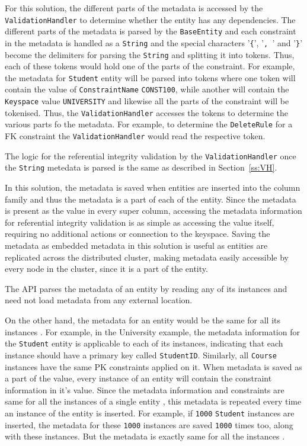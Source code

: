 	For this solution,  the different parts of the metadata is
	accessed by the \texttt{ValidationHandler}  to determine whether the entity has
	any dependencies. The different parts of the metadata is parsed by the
	\texttt{BaseEntity} and each constraint in the metadata is handled as a
	\texttt{String} and the special characters '\texttt{\{}',  '\texttt{, }' and
	'\texttt{\}}' become the delimiters for parsing the \texttt{String} and
	splitting it into tokens. Thus, each of these tokens
	would hold one of the parts of the constraint. For example, the metadata for
	\texttt{Student} entity will be parsed into tokens where one token will
	contain the value of \texttt{ConstraintName} \texttt{CONST100}, while another
	will contain the \texttt{Keyspace} value \texttt{UNIVERSITY} and likewise all the
	parts of the constraint will be tokenised. Thus, the \texttt{ValidationHandler} accesses the tokens to determine the various parts fo the metadata. For example, to determine the \texttt{DeleteRule} for a
	\ac{FK} constraint the \texttt{ValidationHandler} would read the respective token.

	The logic for the referential integrity validation by the
	\texttt{ValidationHandler} once the \texttt{String} metedata is parsed is the
	same as described in Section~\ref{ss:VH}.

	In this solution, the metadata is saved  when entities are inserted into the
	column family and thus the metadata is a part of each of the entity.  Since the
	metadata is present as the value in every super column,  accessing the metadata
	information for referential integrity validation is as simple as accessing the
	value itself,  requiring no additional actions or connection to the
	keyspace. Saving the metadata as embedded metadata in this solution is useful
	as entities are replicated across the distributed cluster, making metadata
	easily accessible by every node in the cluster, since it is a part of the
	entity.
	
	The \ac{API} parses the metadata of an entity by reading any of its 
	instances and need not load metadata from any external location.

	On the other hand,  the metadata for an entity would be the same for all its
	instances .  For example,  in the University example,  the metadata
	information for the \texttt{Student} entity is applicable to each of its
	instances,  indicating that each instance  should have a primary key called
	\texttt{StudentID}.
	Similarly,  all \texttt{Course} instances have the same \ac{PK} constraints
	applied on it.  When metadata is saved as a part of the  value,
	every instance of an entity will contain the constraint information
	in it's value.  Since the metadata information and constraints are same for all
	the instances of a single entity ,  this metadata is repeated every time an
	instance of the entity is inserted.  For example,  if
	\texttt{1000} \texttt{Student} instances are inserted,  the metadata for these
	\texttt{1000} instances are saved \texttt{1000} times too, along with these
	instances.  But the metadata is exactly same for all the
	instances .


